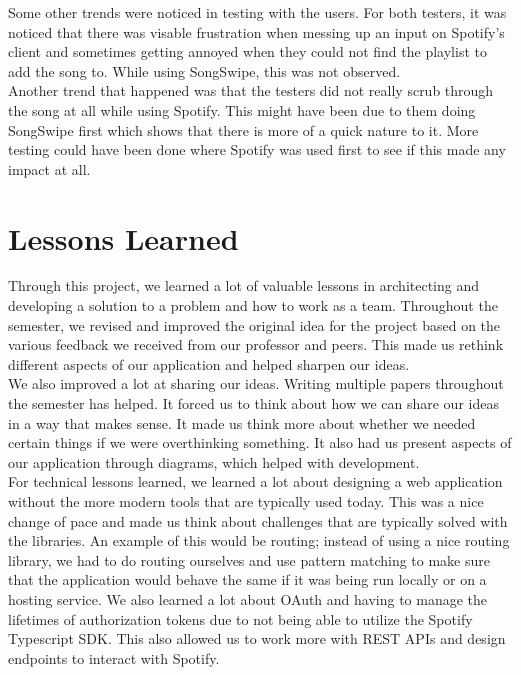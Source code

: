 \documentclass{article}
\begin{document}
Some other trends were noticed in testing with the users. For both testers, it was noticed that there was visable frustration when messing up an input on Spotify's client and sometimes getting annoyed when they could not find the playlist to add the song to. While using SongSwipe, this was not observed.\\

Another trend that happened was that the testers did not really scrub through the song at all while using Spotify. This might have been due to them doing SongSwipe first which shows that there is more of a quick nature to it. More testing could have been done where Spotify was used first to see if this made any impact at all.


\section{Lessons Learned}

Through this project, we learned a lot of valuable lessons in architecting and developing a solution to a problem and how to work as a team. Throughout the semester, we revised and improved the original idea for the project based on the various feedback we received from our professor and peers. This made us rethink different aspects of our application and helped sharpen our ideas. \\

We also improved a lot at sharing our ideas. Writing multiple papers throughout the semester has helped. It forced us to think about how we can share our ideas in a way that makes sense. It made us think more about whether we needed certain things if we were overthinking something. It also had us present aspects of our application through diagrams, which helped with development. \\

For technical lessons learned, we learned a lot about designing a web application without the more modern tools that are typically used today. This was a nice change of pace and made us think about challenges that are typically solved with the libraries. An example of this would be routing; instead of using a nice routing library, we had to do routing ourselves and use pattern matching to make sure that the application would behave the same if it was being run locally or on a hosting service. We also learned a lot about OAuth and having to manage the lifetimes of authorization tokens due to not being able to utilize the Spotify Typescript SDK. This also allowed us to work more with REST APIs and design endpoints to interact with Spotify.
\end{document}
